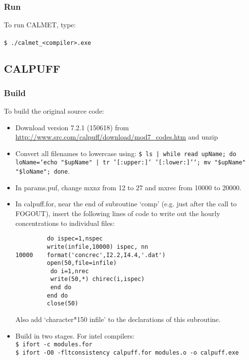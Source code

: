 \documentclass[10pt,a4paper]{article}
\newcommand\tab[1][0.5cm]{\hspace*{#1}}
\begin{document}
\subsubsection{Run}
To run CALMET, type:\\\\
\tab \texttt{\$ ./calmet\_<compiler>.exe}


\subsection{CALPUFF}
\subsubsection{Build}
To build the original source code:
\begin{itemize}
\item Download version 7.2.1 (150618) from \url{http://www.src.com/calpuff/download/mod7_codes.htm} and unzip
\item Convert all filenames to lowercase using: \texttt{\$ ls | while read upName; do loName=`echo "\${upName}" | tr '[:upper:]' '[:lower:]'`; mv "\$upName" "\$loName"; done}.
\item In params.puf, change mxnz from 12 to 27 and mxrec from 10000 to 20000.
\item In calpuff.for, near the end of subroutine `comp' (e.g. just after the call to FOGOUT), insert the following lines of code to write out the hourly concentrations to individual files:\\
\begin{lstlisting}
         do ispec=1,nspec
         write(infile,10000) ispec, nn
10000    format('concrec',I2.2,I4.4,'.dat')
         open(50,file=infile)
          do i=1,nrec
          write(50,*) chirec(i,ispec)
          end do
         end do
         close(50)
\end{lstlisting}
Also add `character*150 infile' to the declarations of this subroutine.
\item Build in two stages. For intel compilers:\\
\tab \texttt{\$ ifort -c modules.for}\\
\tab \texttt{\$ ifort -O0 -fltconsistency calpuff.for modules.o -o calpuff.exe}
\end{itemize}
\end{document}
